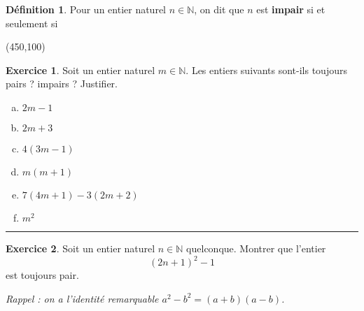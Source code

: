 \documentclass[a4paper, 14pt]{extarticle}
\theoremstyle{plain}
\theoremstyle{definition}
\newtheorem{ex}{Exercice}
\newtheorem*{definition}{Définition}
\newcommand{\N}{\mathbb{N}}
\begin{document}
\begin{definition}
	Pour un entier naturel $n\in\N$, on dit que $n$ est \textbf{impair} si et seulement si 
	
	\vspace{5pt}
	\framebox(450,100){} 
\end{definition}

\begin{ex}
	Soit un entier naturel $m\in\N$. Les entiers suivants sont-ils toujours pairs ? impairs ? Justifier.
	
	\begin{multicols}{2}
	\begin{enumerate}[(a)]
		\item $2m - 1$
		\item $2m + 3$
		\item $4 (3m - 1)$
		\item $ m(m + 1) $
		\item $7(4m + 1)  - 3(2m + 2)$
		\item $m^2$
	\end{enumerate}
	\end{multicols}
\end{ex}

\hrule

\begin{ex}
	Soit  un entier naturel $n\in\N$ quelconque. Montrer que l'entier
		\[ (2n + 1)^2 - 1 \]
	est toujours pair.
	
	\textit{Rappel : on a l'identité remarquable $a^2 - b^2 = (a+b)(a-b)$.}
\end{ex}
\end{document}
